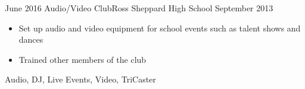
\begin{experiences}
  \experience
    {June 2016}   {Audio/Video Club}{Ross Sheppard High School}{}
    {September 2013} {
                      \begin{itemize}
                        \item Set up audio and video equipment for school events such as talent shows and dances
                        \item Trained other members of the club
                      \end{itemize}
                    }
                    {
                        Audio,
                        DJ,
                        Live Events,
                        Video,
                        TriCaster
                    }

\end{experiences}